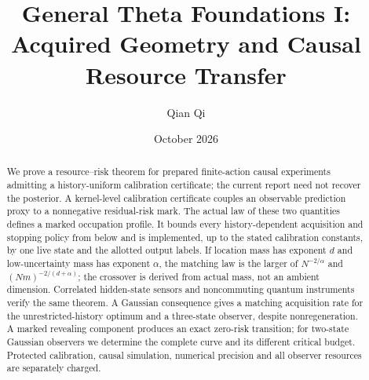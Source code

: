 \documentclass[11pt,reqno]{amsart}
\title[Acquired geometry and causal resource transfer]{General Theta Foundations I:\\Acquired Geometry and Causal Resource Transfer}
\author{Qian Qi}
\date{October 2026}
\numberwithin{equation}{section}
\theoremstyle{definition}
\theoremstyle{remark}
\begin{document}
\begin{abstract}
We prove a resource--risk theorem for prepared finite-action causal experiments admitting a history-uniform calibration certificate; the current report need not recover the posterior. A kernel-level calibration certificate couples an observable prediction proxy to a nonnegative residual-risk mark. The actual law of these two quantities defines a marked occupation profile. It bounds every history-dependent acquisition and stopping policy from below and is implemented, up to the stated calibration constants, by one live state and the allotted output labels. If location mass has exponent $d$ and low-uncertainty mass has exponent $\alpha$, the matching law is the larger of $N^{-2/\alpha}$ and $(Nm)^{-2/(d+\alpha)}$; the crossover is derived from actual mass, not an ambient dimension. Correlated hidden-state sensors and noncommuting quantum instruments verify the same theorem. A Gaussian consequence gives a matching acquisition rate for the unrestricted-history optimum and a three-state observer, despite nonregeneration. A marked revealing component produces an exact zero-risk transition; for two-state Gaussian observers we determine the complete curve and its different critical budget. Protected calibration, causal simulation, numerical precision and all observer resources are separately charged.
\end{abstract}
\maketitle








\appendix



\end{document}
